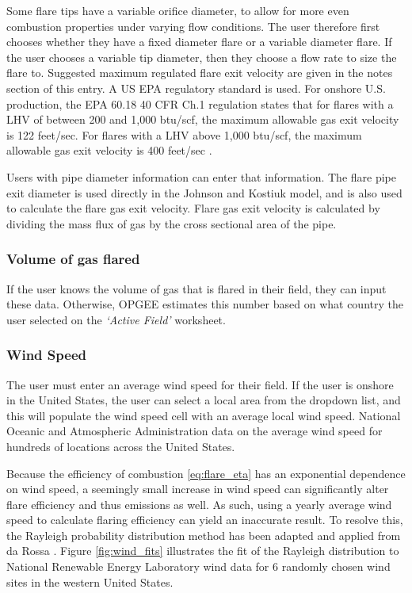 \documentclass[11pt]{report}
\newcommand{\sheet}[1]{\textit{`{#1}'}}
\begin{document}
Some flare tips have a variable orifice diameter, to allow for more even combustion properties under varying flow conditions. The user therefore first chooses whether they have a fixed diameter flare or a variable diameter flare. If the user chooses a variable tip diameter, then they choose a flow rate to size the flare to. Suggested maximum regulated flare exit velocity are given in the notes section of this entry. A US EPA regulatory standard is used. For onshore U.S. production, the EPA 60.18 40 CFR Ch.1 \cite{EPA2010} regulation states that for flares with a LHV of between 200 and 1,000 btu/scf, the maximum allowable gas exit velocity is 122 feet/sec. For flares with a LHV above 1,000 btu/scf, the maximum allowable gas exit velocity is 400 feet/sec \cite{EPA2010}. 

Users with pipe diameter information can enter that information.  The flare pipe exit diameter is used directly in the Johnson and Kostiuk model, and is also used to calculate the flare gas exit velocity. Flare gas exit velocity is calculated by dividing the mass flux of gas by the cross sectional area of the pipe.

\subsubsection{Volume of gas flared}
If the user knows the volume of gas that is flared in their field, they can input these data. Otherwise, OPGEE estimates this number based on what country the user selected on the \sheet{Active Field} worksheet. 

\subsubsection{Wind Speed}
The user must enter an average wind speed for their field.  If the user is onshore in the United States, the user can select a local area from the dropdown list, and this will populate the wind speed cell with an average local wind speed. National Oceanic and Atmospheric Administration data on the average wind speed for hundreds of locations across the United States. 

Because the efficiency of combustion \eqref{eq:flare_eta} has an exponential dependence on wind speed, a seemingly small increase in wind speed can significantly alter flare efficiency and thus emissions as well. As such, using a yearly average wind speed to calculate flaring efficiency can yield an inaccurate result. To resolve this, the Rayleigh probability distribution method has been adapted and applied from da Rossa \cite{daRosa2012}. Figure \ref{fig:wind_fits} illustrates the fit of the Rayleigh distribution to National Renewable Energy Laboratory wind data for 6 randomly chosen wind sites in the western United States.
\end{document}
